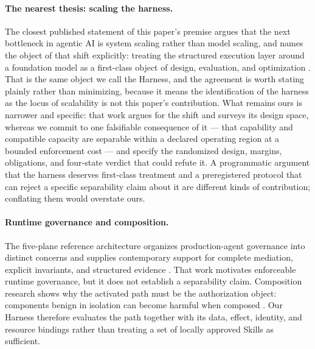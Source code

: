 \documentclass[11pt]{article}
\begin{document}
\paragraph{The nearest thesis: scaling the harness.}
The closest published statement of this paper's premise argues that the next bottleneck in agentic AI is system scaling rather than model scaling, and names the object of that shift explicitly: treating the structured execution layer around a foundation model as a first-class object of design, evaluation, and optimization \cite{gu2026systemscaling}. That is the same object we call the Harness, and the agreement is worth stating plainly rather than minimizing, because it means the identification of the harness as the locus of scalability is not this paper's contribution. What remains ours is narrower and specific: that work argues for the shift and surveys its design space, whereas we commit to one falsifiable consequence of it --- that capability and compatible capacity are separable within a declared operating region at a bounded enforcement cost --- and specify the randomized design, margins, obligations, and four-state verdict that could refute it. A programmatic argument that the harness deserves first-class treatment and a preregistered protocol that can reject a specific separability claim about it are different kinds of contribution; conflating them would overstate ours.

\paragraph{Runtime governance and composition.}
The five-plane reference architecture organizes production-agent governance into distinct concerns and supplies contemporary support for complete mediation, explicit invariants, and structured evidence \cite{tallam2026fiveplane}. That work motivates enforceable runtime governance, but it does not establish a separability claim. Composition research shows why the activated path must be the authorization object: components benign in isolation can become harmful when composed \cite{xie2026composition}. Our Harness therefore evaluates the path together with its data, effect, identity, and resource bindings rather than treating a set of locally approved Skills as sufficient.
\end{document}
